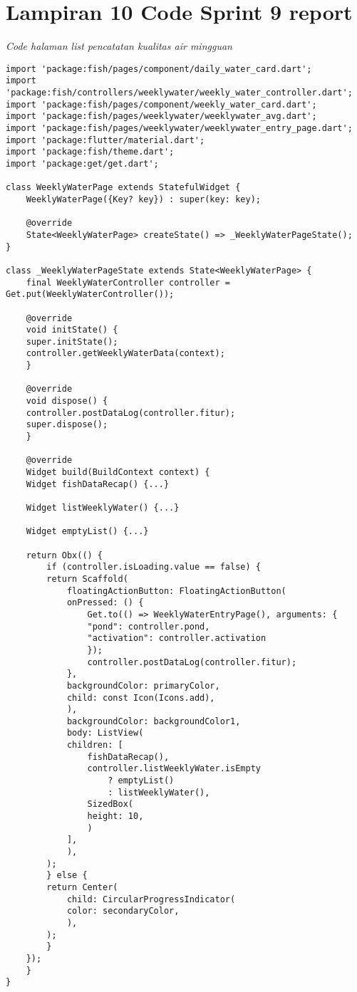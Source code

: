 	\section{Lampiran 10 Code Sprint 9 report}
	\textit{Code halaman list pencatatan kualitas air mingguan}
	\begin{lstlisting}
import 'package:fish/pages/component/daily_water_card.dart';
import 'package:fish/controllers/weeklywater/weekly_water_controller.dart';
import 'package:fish/pages/component/weekly_water_card.dart';
import 'package:fish/pages/weeklywater/weeklywater_avg.dart';
import 'package:fish/pages/weeklywater/weeklywater_entry_page.dart';
import 'package:flutter/material.dart';
import 'package:fish/theme.dart';
import 'package:get/get.dart';

class WeeklyWaterPage extends StatefulWidget {
    WeeklyWaterPage({Key? key}) : super(key: key);

    @override
    State<WeeklyWaterPage> createState() => _WeeklyWaterPageState();
}

class _WeeklyWaterPageState extends State<WeeklyWaterPage> {
    final WeeklyWaterController controller = Get.put(WeeklyWaterController());

    @override
    void initState() {
    super.initState();
    controller.getWeeklyWaterData(context);
    }

    @override
    void dispose() {
    controller.postDataLog(controller.fitur);
    super.dispose();
    }

    @override
    Widget build(BuildContext context) {
    Widget fishDataRecap() {...}

    Widget listWeeklyWater() {...}

    Widget emptyList() {...}

    return Obx(() {
        if (controller.isLoading.value == false) {
        return Scaffold(
            floatingActionButton: FloatingActionButton(
            onPressed: () {
                Get.to(() => WeeklyWaterEntryPage(), arguments: {
                "pond": controller.pond,
                "activation": controller.activation
                });
                controller.postDataLog(controller.fitur);
            },
            backgroundColor: primaryColor,
            child: const Icon(Icons.add),
            ),
            backgroundColor: backgroundColor1,
            body: ListView(
            children: [
                fishDataRecap(),
                controller.listWeeklyWater.isEmpty
                    ? emptyList()
                    : listWeeklyWater(),
                SizedBox(
                height: 10,
                )
            ],
            ),
        );
        } else {
        return Center(
            child: CircularProgressIndicator(
            color: secondaryColor,
            ),
        );
        }
    });
    }
}        
	\end{lstlisting}

